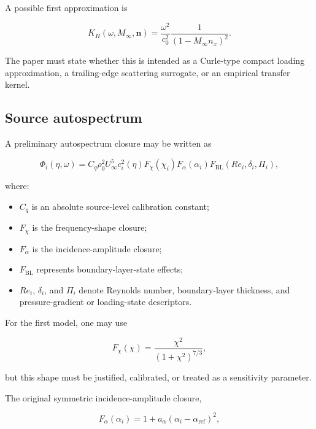 \documentclass[11pt]{article}
\newcommand{\vect}[1]{\bm{#1}}
\begin{document}
A possible first approximation is

\begin{equation}
    K_H(\omega,M_{\infty},\vect{n})
    =
    \frac{\omega^2}{c_0^2}
    \frac{1}{(1-M_{\infty}n_x)^2}.
\end{equation}

The paper must state whether this is intended as a Curle-type compact loading approximation, a trailing-edge scattering surrogate, or an empirical transfer kernel.

\subsection{Source autospectrum}

A preliminary autospectrum closure may be written as

\begin{equation}
    \Phi_i(\eta,\omega)
    =
    C_q
    \rho_0^2
    U_{\infty}^{5}
    c_i^2(\eta)
    F_{\chi}\!\left(\chi_i\right)
    F_{\alpha}\!\left(\alpha_i\right)
    F_{\mathrm{BL}}\!\left(Re_i,\delta_i,\Pi_i\right),
\end{equation}

where:

\begin{itemize}
    \item $C_q$ is an absolute source-level calibration constant;
    \item $F_{\chi}$ is the frequency-shape closure;
    \item $F_{\alpha}$ is the incidence-amplitude closure;
    \item $F_{\mathrm{BL}}$ represents boundary-layer-state effects;
    \item $Re_i$, $\delta_i$, and $\Pi_i$ denote Reynolds number, boundary-layer thickness, and pressure-gradient or loading-state descriptors.
\end{itemize}

For the first model, one may use

\begin{equation}
    F_{\chi}(\chi)
    =
    \frac{\chi^2}{(1+\chi^2)^{7/3}},
\end{equation}

but this shape must be justified, calibrated, or treated as a sensitivity parameter.

The original symmetric incidence-amplitude closure,

\begin{equation}
    F_{\alpha}(\alpha_i)
    =
    1+a_{\alpha}(\alpha_i-\alpha_{\mathrm{ref}})^2,
\end{equation}
\end{document}
